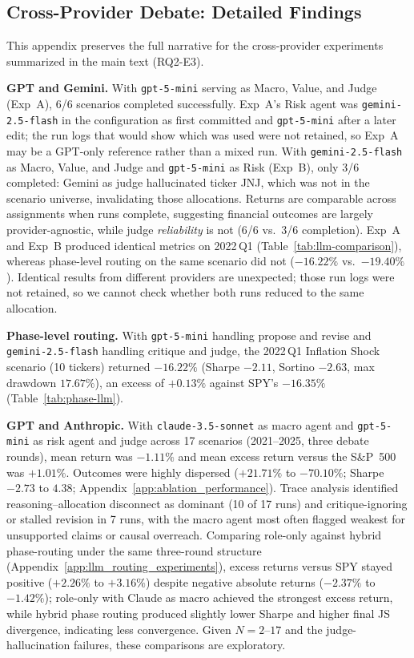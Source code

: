 \documentclass{article}
\begin{document}
\subsection{Cross-Provider Debate: Detailed Findings}
\label{app:cross-provider}

This appendix preserves the full narrative for the cross-provider experiments
summarized in the main text (RQ2-E3).

\textbf{GPT and Gemini.} With \texttt{gpt-5-mini} serving as Macro, Value, and Judge
(Exp~A), 6/6 scenarios completed successfully. Exp~A's Risk agent was
\texttt{gemini-2.5-flash} in the configuration as first committed and \texttt{gpt-5-mini}
after a later edit; the run logs that would show which was used were not retained, so
Exp~A may be a GPT-only reference rather than a mixed run. With \texttt{gemini-2.5-flash}
as Macro, Value, and Judge and \texttt{gpt-5-mini} as Risk (Exp~B), only 3/6
completed: Gemini as judge hallucinated ticker JNJ,
which was not in the scenario universe, invalidating those allocations. Returns are
comparable across assignments when runs complete, suggesting financial outcomes are
largely provider-agnostic, while judge \emph{reliability} is not (6/6 vs.\ 3/6
completion). Exp~A and Exp~B produced identical metrics on 2022\,Q1
(Table~\ref{tab:llm-comparison}), whereas phase-level routing on the same scenario did
not ($-16.22\%$ vs.\ $-19.40\%$). Identical results from different providers are
unexpected; those run logs were not retained, so we cannot check whether both runs
reduced to the same allocation.

\textbf{Phase-level routing.} With \texttt{gpt-5-mini} handling propose and revise and
\texttt{gemini-2.5-flash} handling critique and judge, the 2022\,Q1 Inflation Shock
scenario (10 tickers) returned $-16.22\%$ (Sharpe $-2.11$, Sortino $-2.63$, max
drawdown $17.67\%$), an excess of $+0.13\%$ against SPY's $-16.35\%$
(Table~\ref{tab:phase-llm}).

\textbf{GPT and Anthropic.} With \texttt{claude-3.5-sonnet} as macro agent and
\texttt{gpt-5-mini} as risk agent and judge across 17 scenarios (2021--2025, three
debate rounds), mean return was $-1.11\%$ and mean excess return versus the S\&P~500
was $+1.01\%$. Outcomes were highly dispersed ($+21.71\%$ to $-70.10\%$; Sharpe
$-2.73$ to $4.38$; Appendix~\ref{app:ablation_performance}). Trace analysis identified
reasoning--allocation disconnect as dominant (10 of 17 runs) and critique-ignoring or
stalled revision in 7 runs, with the macro agent most often flagged weakest for
unsupported claims or causal overreach. Comparing role-only against hybrid
phase-routing under the same three-round structure
(Appendix~\ref{app:llm_routing_experiments}), excess returns versus SPY stayed
positive ($+2.26\%$ to $+3.16\%$) despite negative absolute returns ($-2.37\%$ to
$-1.42\%$); role-only with Claude as macro achieved the strongest excess return, while
hybrid phase routing produced slightly lower Sharpe and higher final JS divergence,
indicating less convergence. Given $N{=}2$--$17$ and the judge-hallucination failures,
these comparisons are exploratory.
\end{document}
